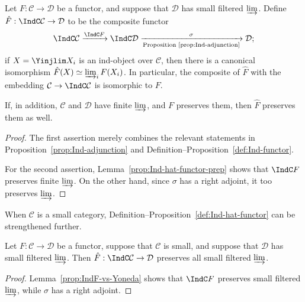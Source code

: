 \begin{definition-proposition}\label{def:Ind-hat-functor}
	Let $F:\mathcal{C}\to\mathcal{D}$ be a functor, and suppose that $\mathcal{D}$ has small filtered $\varinjlim$. Define $\hat{F}:\IndC\mathcal{C}\to\mathcal{D}$ to be the composite functor
	\[ \IndC\mathcal{C} \xrightarrow{\IndC F} \IndC\mathcal{D} \xrightarrow[\text{Proposition \ref{prop:Ind-adjunction}}]{\sigma} \mathcal{D}; \]
	if $X=\Yinjlim X_i$ is an ind-object over $\mathcal{C}$, then there is a canonical isomorphism $\hat{F}(X)\simeq\varinjlim_i F(X_i)$. In particular, the composite of $\hat{F}$ with the embedding $\mathcal{C}\to\IndC\mathcal{C}$ is isomorphic to $F$.

	If, in addition, $\mathcal{C}$ and $\mathcal{D}$ have finite $\varinjlim$, and $F$ preserves them, then $\hat{F}$ preserves them as well.
\end{definition-proposition}
\begin{proof}
	The first assertion merely combines the relevant statements in Proposition~\ref{prop:Ind-adjunction} and Definition--Proposition~\ref{def:Ind-functor}.

	For the second assertion, Lemma~\ref{prop:Ind-hat-functor-prep} shows that $\IndC F$ preserves finite $\varinjlim$. On the other hand, since $\sigma$ has a right adjoint, it too preserves $\varinjlim$.
\end{proof}

When $\mathcal{C}$ is a small category, Definition--Proposition~\ref{def:Ind-hat-functor} can be strengthened further.

\begin{proposition}\label{prop:Ind-hat-small}
	Let $F:\mathcal{C}\to\mathcal{D}$ be a functor, suppose that $\mathcal{C}$ is small, and suppose that $\mathcal{D}$ has small filtered $\varinjlim$. Then $\hat{F}:\IndC\mathcal{C}\to\mathcal{D}$ preserves all small filtered $\varinjlim$.
\end{proposition}
\begin{proof}
	Lemma~\ref{prop:IndF-vs-Yoneda} shows that $\IndC F$ preserves small filtered $\varinjlim$, while $\sigma$ has a right adjoint.
\end{proof}

